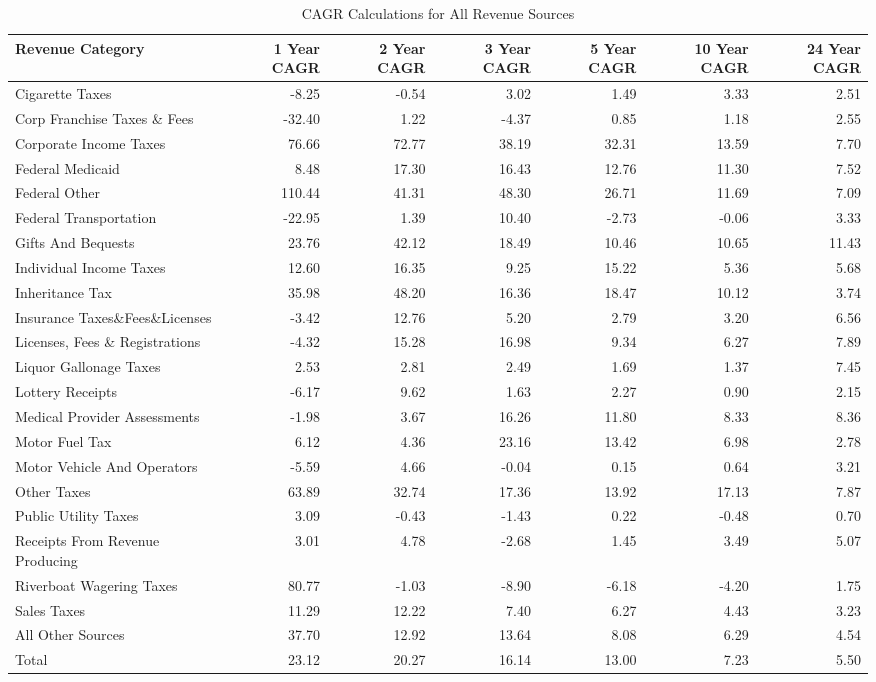 \documentclass[
  letterpaper,
  DIV=11,
  numbers=noendperiod]{scrreport}
\begin{document}
\begin{table}

\caption{CAGR Calculations for All Revenue Sources}
\centering
\begin{tabular}[t]{l|r|r|r|r|r|r}
\hline
Revenue Category & 1 Year CAGR & 2 Year CAGR & 3 Year CAGR & 5 Year CAGR & 10 Year CAGR & 24 Year CAGR\\
\hline
Cigarette Taxes & -8.25 & -0.54 & 3.02 & 1.49 & 3.33 & 2.51\\
\hline
Corp Franchise Taxes \& Fees & -32.40 & 1.22 & -4.37 & 0.85 & 1.18 & 2.55\\
\hline
Corporate Income Taxes & 76.66 & 72.77 & 38.19 & 32.31 & 13.59 & 7.70\\
\hline
Federal Medicaid & 8.48 & 17.30 & 16.43 & 12.76 & 11.30 & 7.52\\
\hline
Federal Other & 110.44 & 41.31 & 48.30 & 26.71 & 11.69 & 7.09\\
\hline
Federal Transportation & -22.95 & 1.39 & 10.40 & -2.73 & -0.06 & 3.33\\
\hline
Gifts And Bequests & 23.76 & 42.12 & 18.49 & 10.46 & 10.65 & 11.43\\
\hline
Individual Income Taxes & 12.60 & 16.35 & 9.25 & 15.22 & 5.36 & 5.68\\
\hline
Inheritance Tax & 35.98 & 48.20 & 16.36 & 18.47 & 10.12 & 3.74\\
\hline
Insurance Taxes\&Fees\&Licenses & -3.42 & 12.76 & 5.20 & 2.79 & 3.20 & 6.56\\
\hline
Licenses, Fees \& Registrations & -4.32 & 15.28 & 16.98 & 9.34 & 6.27 & 7.89\\
\hline
Liquor Gallonage Taxes & 2.53 & 2.81 & 2.49 & 1.69 & 1.37 & 7.45\\
\hline
Lottery Receipts & -6.17 & 9.62 & 1.63 & 2.27 & 0.90 & 2.15\\
\hline
Medical Provider Assessments & -1.98 & 3.67 & 16.26 & 11.80 & 8.33 & 8.36\\
\hline
Motor Fuel Tax & 6.12 & 4.36 & 23.16 & 13.42 & 6.98 & 2.78\\
\hline
Motor Vehicle And Operators & -5.59 & 4.66 & -0.04 & 0.15 & 0.64 & 3.21\\
\hline
Other Taxes & 63.89 & 32.74 & 17.36 & 13.92 & 17.13 & 7.87\\
\hline
Public Utility Taxes & 3.09 & -0.43 & -1.43 & 0.22 & -0.48 & 0.70\\
\hline
Receipts From Revenue Producing & 3.01 & 4.78 & -2.68 & 1.45 & 3.49 & 5.07\\
\hline
Riverboat Wagering Taxes & 80.77 & -1.03 & -8.90 & -6.18 & -4.20 & 1.75\\
\hline
Sales Taxes & 11.29 & 12.22 & 7.40 & 6.27 & 4.43 & 3.23\\
\hline
All Other Sources & 37.70 & 12.92 & 13.64 & 8.08 & 6.29 & 4.54\\
\hline
Total & 23.12 & 20.27 & 16.14 & 13.00 & 7.23 & 5.50\\
\hline
\end{tabular}
\end{table}
\end{document}

